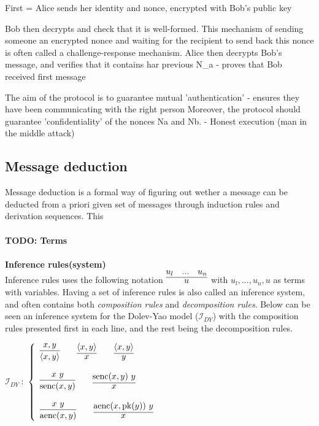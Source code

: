 First 					= Alice sends her identity and nonce, encrypted with Bob's public key

Bob then decrypts and check that it is well-formed.
This mechanism of sending someone an encrypted nonce and waiting for the recipient to send back this nonce is often called a challenge-response mechanism.
Alice then decrypts Bob's message, and verifies that it contains har previous N_a - proves that Bob received first message

The aim of the protocol is to guarantee mutual 'authentication' - ensures they have been communicating with the right person
Moreover, the protocol should guarantee 'confidentiality' of the nonces Na and Nb.
 - Honest execution (man in the middle attack)
\fi

\subsection{Message deduction}
Message deduction is a formal way of figuring out wether a message can be deducted from a priori given set of messages through induction rules and derivation sequences. This \\ \\
\textbf{TODO: Terms} \\ \\
\textbf{Inference rules(system)} \\
Inference rules uses the following notation $\infer{u} {u_l & ... & u_n}$ with $u_l,...,u_n, u$ as terms with variables. Having a set of inference rules is also called an inference system, and often contains both \textit{composition rules} and \textit{decomposition rules}. Below can be seen an inference system for the Dolev-Yao model ($\mathcal{I}_{DY}$) with the composition rules presented first in each line, and the rest being the decomposition rules. 
\begin{center}
$\mathcal{I}_{DY}\ :$
\begin{math}
  \left\{
    \begin{array}{l l l}
      \infer{\langle x, y \rangle}{x,y} \qquad \infer{x}{\langle x, y \rangle} \qquad \infer{y}{\langle x, y \rangle} \\ \\
      \infer{\text{senc}(x, y)}{x\ y} \qquad  \infer{x}{\text{senc}(x, y)\ y} \\ \\
      \infer{\text{aenc}(x, y)}{x\ y} \qquad \infer{x}{\text{aenc}(x, \text{pk}(y))\ y}
    \end{array}
  \right.
\end{math}
\end{center}

